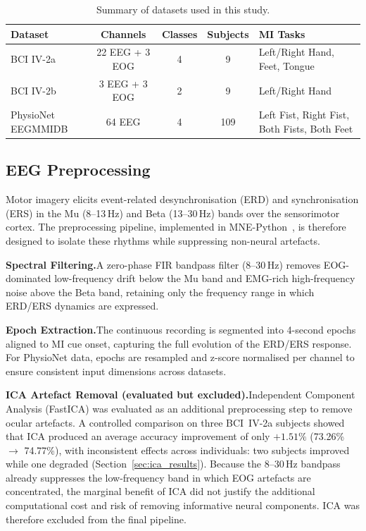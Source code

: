 \documentclass[12pt, a4paper]{article}
\begin{document}
\begin{table}[htbp]
\centering
\caption{Summary of datasets used in this study.}
\label{tab:datasets}
\begin{tabular}{lcccl}
\toprule
\textbf{Dataset} & \textbf{Channels} & \textbf{Classes} & \textbf{Subjects} & \textbf{MI Tasks} \\
\midrule
BCI IV-2a & 22 EEG + 3 EOG & 4 & 9 & Left/Right Hand, Feet, Tongue \\
BCI IV-2b & 3 EEG + 3 EOG & 2 & 9 & Left/Right Hand \\
PhysioNet EEGMMIDB & 64 EEG & 4 & 109 & Left Fist, Right Fist, Both Fists, Both Feet \\
\bottomrule
\end{tabular}
\end{table}

\subsection{EEG Preprocessing}

Motor imagery elicits event-related desynchronisation (ERD) and synchronisation (ERS) in the Mu (8--13\,Hz) and Beta (13--30\,Hz) bands over the sensorimotor cortex. The preprocessing pipeline, implemented in MNE-Python~\cite{gramfort2013mne}, is therefore designed to isolate these rhythms while suppressing non-neural artefacts.

\textbf{Spectral Filtering.}\quad A zero-phase FIR bandpass filter (8--30\,Hz) removes EOG-dominated low-frequency drift below the Mu band and EMG-rich high-frequency noise above the Beta band, retaining only the frequency range in which ERD/ERS dynamics are expressed.

\textbf{Epoch Extraction.}\quad The continuous recording is segmented into 4-second epochs aligned to MI cue onset, capturing the full evolution of the ERD/ERS response. For PhysioNet data, epochs are resampled and z-score normalised per channel to ensure consistent input dimensions across datasets.

\textbf{ICA Artefact Removal (evaluated but excluded).}\quad Independent Component Analysis (FastICA) was evaluated as an additional preprocessing step to remove ocular artefacts. A controlled comparison on three BCI~IV-2a subjects showed that ICA produced an average accuracy improvement of only $+1.51\%$ (73.26\% $\to$ 74.77\%), with inconsistent effects across individuals: two subjects improved while one degraded (Section~\ref{sec:ica_results}). Because the 8--30\,Hz bandpass already suppresses the low-frequency band in which EOG artefacts are concentrated, the marginal benefit of ICA did not justify the additional computational cost and risk of removing informative neural components. ICA was therefore excluded from the final pipeline.
\end{document}
